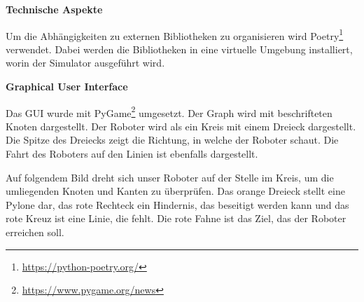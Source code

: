 \textbf{Technische Aspekte}\label{technical-aspect-simulator}

Um die Abhängigkeiten zu externen Bibliotheken zu organisieren wird Poetry\footnote{\url{https://python-poetry.org/}} verwendet. Dabei werden die Bibliotheken in eine virtuelle Umgebung installiert, worin der Simulator ausgeführt wird.

\textbf{Graphical User Interface}

Das GUI wurde mit PyGame\footnote{\url{https://www.pygame.org/news}} umgesetzt. Der Graph wird mit beschrifteten Knoten dargestellt. Der Roboter wird als ein Kreis mit einem Dreieck dargestellt. Die Spitze des Dreiecks zeigt die Richtung, in welche der Roboter schaut.
Die Fahrt des Roboters auf den Linien ist ebenfalls dargestellt.

Auf folgendem Bild dreht sich unser Roboter auf der Stelle im Kreis, um die umliegenden Knoten und Kanten zu überprüfen.
Das orange Dreieck stellt eine Pylone dar, das rote Rechteck ein Hindernis, das beseitigt werden kann und das rote Kreuz ist eine Linie, die fehlt. Die rote Fahne ist das Ziel, das der Roboter erreichen soll.

